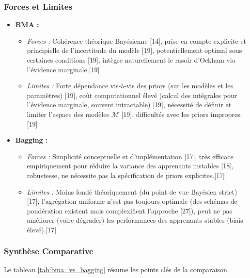 \documentclass[11pt,a4paper]{article}
\begin{document}
\subsubsection{Forces et Limites}
\begin{itemize}
    \item \textbf{BMA :}
        \begin{itemize}
            \item \textit{Forces :} Cohérence théorique Bayésienne [14], prise en compte explicite et principielle de l'incertitude du modèle [19], potentiellement optimal sous certaines conditions [19], intègre naturellement le rasoir d'Ockham via l'évidence marginale.[19]
            \item \textit{Limites :} Forte dépendance vis-à-vis des priors (sur les modèles et les paramètres) [19], coût computationnel élevé (calcul des intégrales pour l'évidence marginale, souvent intractable) [19], nécessité de définir et limiter l'espace des modèles $\mathcal{M}$ [19], difficultés avec les priors impropres.[19]
        \end{itemize}
    \item \textbf{Bagging :}
        \begin{itemize}
            \item \textit{Forces :} Simplicité conceptuelle et d'implémentation [17], très efficace empiriquement pour réduire la variance des apprenants instables [18], robustesse, ne nécessite pas la spécification de priors explicites.[17]
            \item \textit{Limites :} Moins fondé théoriquement (du point de vue Bayésien strict) [17], l'agrégation uniforme n'est pas toujours optimale (des schémas de pondération existent mais complexifient l'approche [27]), peut ne pas améliorer (voire dégrader) les performances des apprenants stables (biais élevé).[17]
        \end{itemize}
\end{itemize}

\subsubsection{Synthèse Comparative}

Le tableau \ref{tab:bma_vs_bagging} résume les points clés de la comparaison.
\end{document}
